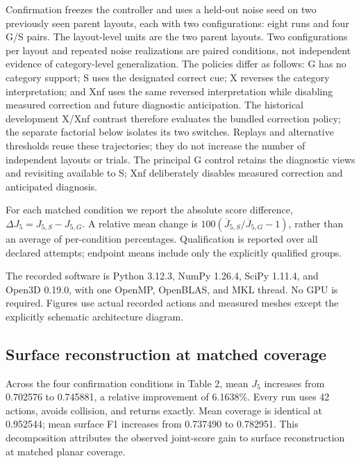Confirmation freezes the controller and uses a held-out noise seed on two previously seen parent layouts, each with two configurations: eight runs and four G/S pairs. The layout-level units are the two parent layouts. Two configurations per layout and repeated noise realizations are paired conditions, not independent evidence of category-level generalization. The policies differ as follows: G has no category support; S uses the designated correct cue; X reverses the category interpretation; and Xnf uses the same reversed interpretation while disabling measured correction and future diagnostic anticipation. The historical development X/Xnf contrast therefore evaluates the bundled correction policy; the separate factorial below isolates its two switches. Replays and alternative thresholds reuse these trajectories; they do not increase the number of independent layouts or trials. The principal G control retains the diagnostic views and revisiting available to S; Xnf deliberately disables measured correction and anticipated diagnosis.

For each matched condition we report the absolute score difference, \(\Delta J_5=J_{5,S}-J_{5,G}\). A relative mean change is \(100(\overline J_{5,S}/\overline J_{5,G}-1)\), rather than an average of per-condition percentages. Qualification is reported over all declared attempts; endpoint means include only the explicitly qualified groups.

The recorded software is Python 3.12.3, NumPy 1.26.4, SciPy 1.11.4, and Open3D 0.19.0, with one OpenMP, OpenBLAS, and MKL thread. No GPU is required. Figures use actual recorded actions and measured meshes except the explicitly schematic architecture diagram.



\hypertarget{surface-reconstruction-at-matched-coverage}{%
\subsection{Surface reconstruction at matched coverage}\label{surface-reconstruction-at-matched-coverage}}

Across the four confirmation conditions in Table 2, mean \(J_5\) increases from 0.702576 to 0.745881, a relative improvement of 6.1638\%. Every run uses 42 actions, avoids collision, and returns exactly. Mean coverage is identical at 0.952544; mean surface F1 increases from 0.737490 to 0.782951. This decomposition attributes the observed joint-score gain to surface reconstruction at matched planar coverage.

